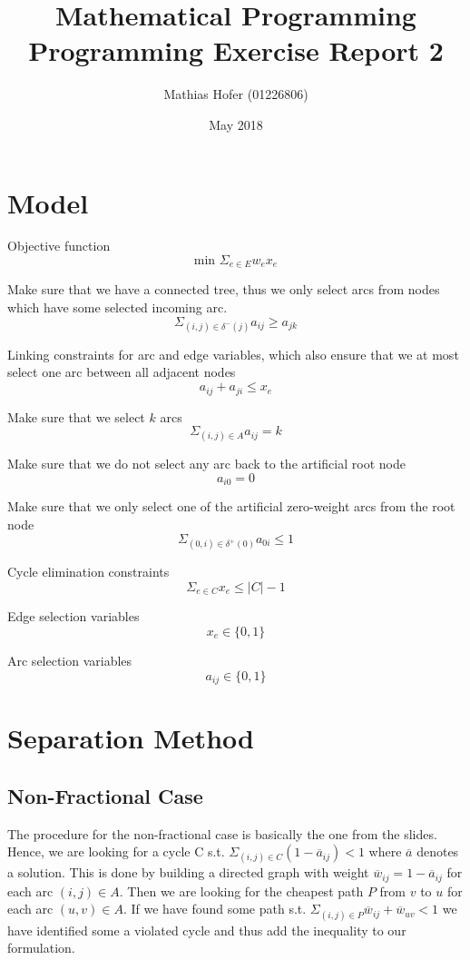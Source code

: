 \documentclass{article}
\title{Mathematical Programming\\Programming Exercise Report 2}
\author{Mathias Hofer (01226806)}
\date{May 2018}
\begin{document}
\maketitle

\section{Model}
Objective function
\[\text{min } \Sigma_{e \in E} w_e x_e\]

\noindent
Make sure that we have a connected tree, thus we only select arcs from nodes which have some selected incoming arc.
\[\Sigma_{(i,j) \in \delta^-(j)} a_{i j} \ge a_{j k} \tag*{$\forall j \in V$, $\forall (j,k) \in \delta^+(j)$}\]

\noindent
Linking constraints for arc and edge variables, which also ensure that we at most select one arc between all adjacent nodes
\[a_{i j} + a_{j i} \leq x_e \tag*{$\forall e=(i,j) \in E$}\]

\noindent
Make sure that we select $k$ arcs
\[\Sigma_{(i,j) \in A} a_{i j} = k\]

\noindent
Make sure that we do not select any arc back to the artificial root node
\[a_{i 0} = 0 \tag*{$\forall i \in V$}\]

\noindent
Make sure that we only select one of the artificial zero-weight arcs from the root node
\[\Sigma_{(0,i) \in \delta^+(0)} a_{0 i} \le 1\]

\noindent
Cycle elimination constraints
\[\Sigma_{e \in C} x_e \leq |C| - 1 \tag*{$\forall C \subseteq E$, $|C| \geq 2$, $C$ forms a cycle}\]

\noindent
Edge selection variables
\[x_e \in \{0, 1\} \tag*{$e \in E$}\]

\noindent
Arc selection variables
\[a_{i j} \in \{0, 1\} \tag*{$(i,j) \in A$}\]

\section{Separation Method}

\subsection{Non-Fractional Case}

The procedure for the non-fractional case is basically the one from the slides. Hence, we are looking for a cycle C s.t. $\Sigma_{(i,j) \in C} (1 - \overline{a}_{i j}) < 1$ where $\overline{a}$ denotes a solution. This is done by building a directed graph with weight $\overline{w}_{i j} = 1 - \overline{a}_{i j}$ for each arc $(i,j) \in A$. Then we are looking for the cheapest path $P$ from $v$ to $u$ for each arc $(u,v) \in A$. If we have found some path s.t. $\Sigma_{(i,j) \in P} \overline{w}_{i j} + \overline{w}_{u v} < 1$ we have identified some a violated cycle and thus add the inequality to our formulation.
\end{document}
